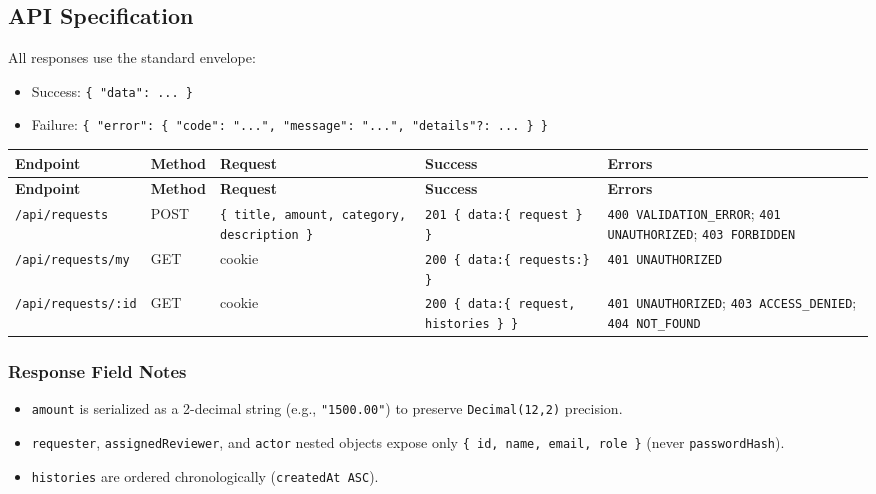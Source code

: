 \documentclass[11pt,a4paper]{article}
\begin{document}
\subsection{API Specification}

All responses use the standard envelope:\\
\begin{itemize}[leftmargin=*,itemsep=2pt,topsep=2pt]
  \item Success: \texttt{\{ "data": ... \}}
  \item Failure: \texttt{\{ "error": \{ "code": "...", "message": "...", "details"?: ... \} \}}
\end{itemize}
\vspace{0.3em}
\begin{longtable}{|>{\RaggedRight}p{3.5cm}|>{\centering\arraybackslash}p{1.4cm}|>{\RaggedRight}p{2.2cm}|>{\RaggedRight}p{5.2cm}|>{\RaggedRight}p{3.5cm}|}
\hline
\rowcolor{zenPale}\textbf{Endpoint} & \textbf{Method} & \textbf{Request} & \textbf{Success} & \textbf{Errors} \\ \hline
\endfirsthead
\hline
\rowcolor{zenPale}\textbf{Endpoint} & \textbf{Method} & \textbf{Request} & \textbf{Success} & \textbf{Errors} \\ \hline
\endhead
\hline
\endfoot
\texttt{/\allowbreak api/\allowbreak requests} & POST & \texttt{\{ title, amount, category, description \}} & \texttt{201 \{ data:\allowbreak  \{ request \} \}} & \texttt{400 VALIDATION\_\allowbreak ERROR}; \texttt{401 UNAUTHORIZED}; \texttt{403 FORBIDDEN} \\ \hline
\texttt{/\allowbreak api/\allowbreak requests/\allowbreak my} & GET & cookie & \texttt{200 \{ data:\allowbreak  \{ requests: \} \}} & \texttt{401 UNAUTHORIZED} \\ \hline
\texttt{/\allowbreak api/\allowbreak requests/\allowbreak :\allowbreak id} & GET & cookie & \texttt{200 \{ data:\allowbreak  \{ request, histories \} \}} & \texttt{401 UNAUTHORIZED}; \texttt{403 ACCESS\_\allowbreak DENIED}; \texttt{404 NOT\_\allowbreak FOUND} \\ \hline
\end{longtable}
\vspace{0.3em}

\subsubsection{Response Field Notes}
\begin{itemize}[leftmargin=*,itemsep=2pt,topsep=2pt]
  \item \texttt{amount} is serialized as a 2-decimal string (e.g., \texttt{"1500.00"}) to preserve \texttt{Decimal(12,2)} precision.
  \item \texttt{requester}, \texttt{assignedReviewer}, and \texttt{actor} nested objects expose only \texttt{\{ id, name, email, role \}} (never \texttt{passwordHash}).
  \item \texttt{histories} are ordered chronologically (\texttt{createdAt ASC}).
\end{itemize}
\end{document}
